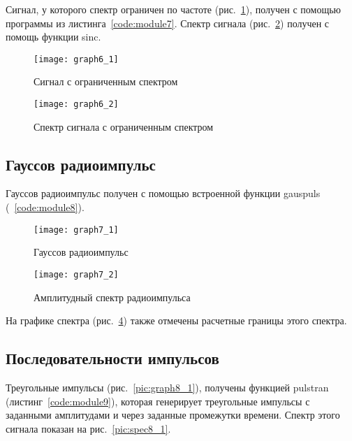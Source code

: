 Сигнал, у которого спектр ограничен по частоте (рис.~\ref{pic:graph6_1}), получен с помощью программы из листинга~\ref{code:module7}. 
Спектр сигнала (рис.~\ref{pic:graph6_2}) получен с помощь функции sinc.

\begin{figure}[H]
	\begin{center}
		\texttt{[image: graph6\_1]}
		\caption{Сигнал с ограниченным спектром} 
		\label{pic:graph6_1} %
	\end{center}
\end{figure}
\begin{figure}[H]
	\begin{center}
		\texttt{[image: graph6\_2]}
		\caption{Спектр сигнала с ограниченным спектром} 
		\label{pic:graph6_2} %
	\end{center}
\end{figure}

\subsection{Гауссов радиоимпульс}

Гауссов радиоимпульс получен с помощью встроенной функции gauspuls (~\ref{code:module8}). 
\begin{figure}[H]
	\begin{center}
		\texttt{[image: graph7\_1]}
		\caption{Гауссов радиоимпульс} 
		\label{pic:graph7_1} %
	\end{center}
\end{figure}
\begin{figure}[H]
	\begin{center}
		\texttt{[image: graph7\_2]}
		\caption{Амплитудный спектр радиоимпульса} 
		\label{pic:graph7_2} %
	\end{center}
\end{figure}
На графике спектра (рис.~\ref{pic:graph7_2}) также отмечены расчетные границы этого спектра.

\subsection{Последовательности импульсов}

Треугольные импульсы (рис.~\ref{pic:graph8_1}), получены функцией pulstran (листинг~\ref{code:module9}), которая 
генерирует треугольные импульсы с заданными амплитудами и через заданные промежутки времени. Спектр этого сигнала 
показан на рис.~\ref{pic:spec8_1}.

